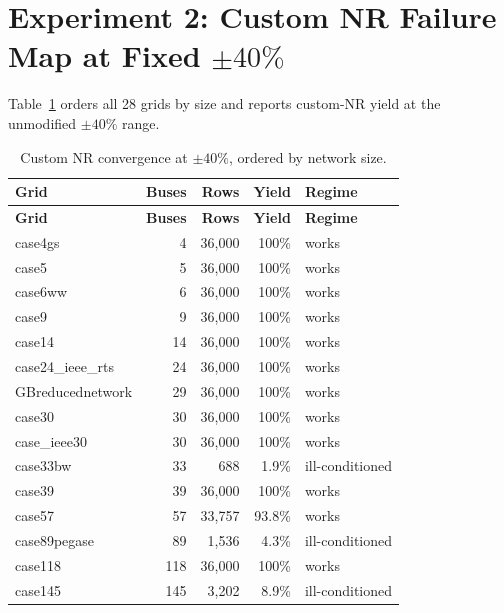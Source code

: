 \documentclass{article}
\newcommand{\cok}[1]{\textcolor{good}{#1}}
\newcommand{\cbad}[1]{\textcolor{bad}{#1}}
\begin{document}
\section{Experiment 2: Custom NR Failure Map at Fixed $\pm40\%$}
\label{sec:map}

Table~\ref{tab:custom} orders all 28 grids by size and reports custom-NR
yield at the unmodified $\pm40\%$ range.

\begin{longtable}{l r r r l}
\caption{Custom NR convergence at $\pm40\%$, ordered by network size.}
\label{tab:custom}\\
\toprule
\textbf{Grid} & \textbf{Buses} & \textbf{Rows} & \textbf{Yield} & \textbf{Regime} \\
\midrule
\endfirsthead
\toprule
\textbf{Grid} & \textbf{Buses} & \textbf{Rows} & \textbf{Yield} & \textbf{Regime} \\
\midrule
\endhead
case4gs           & 4     & \cok{36{,}000} & 100\%  & works \\
case5             & 5     & \cok{36{,}000} & 100\%  & works \\
case6ww           & 6     & \cok{36{,}000} & 100\%  & works \\
case9             & 9     & \cok{36{,}000} & 100\%  & works \\
case14            & 14    & \cok{36{,}000} & 100\%  & works \\
case24\_ieee\_rts & 24    & \cok{36{,}000} & 100\%  & works \\
GBreducednetwork  & 29    & \cok{36{,}000} & 100\%  & works \\
case30            & 30    & \cok{36{,}000} & 100\%  & works \\
case\_ieee30      & 30    & \cok{36{,}000} & 100\%  & works \\
case33bw          & 33    & \cbad{688}      & 1.9\%  & \cbad{ill-conditioned} \\
case39            & 39    & \cok{36{,}000} & 100\%  & works \\
case57            & 57    & \cok{33{,}757} & 93.8\% & works \\
case89pegase      & 89    & \cbad{1{,}536}  & 4.3\%  & \cbad{ill-conditioned} \\
case118           & 118   & \cok{36{,}000} & 100\%  & works \\
case145           & 145   & \cbad{3{,}202}  & 8.9\%  & \cbad{ill-conditioned} \\

\end{longtable}
\end{document}
